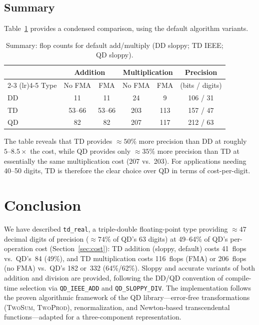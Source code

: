 \documentclass[11pt,a4paper]{article}
\begin{document}
\subsection{Summary}

Table~\ref{tab:summary-flops} provides a condensed comparison,
using the default algorithm variants.

\begin{table}[h]
\centering
\caption{Summary: flop counts for default add/multiply
  (DD sloppy; TD IEEE; QD sloppy).}
\label{tab:summary-flops}
\begin{tabular}{lccccc}
\toprule
      & \multicolumn{2}{c}{Addition}
      & \multicolumn{2}{c}{Multiplication}
      & Precision \\
\cmidrule(lr){2-3} \cmidrule(lr){4-5}
Type & No FMA & FMA & No FMA & FMA & (bits / digits) \\
\midrule
DD &  11 &  11 &  24 &   9 & 106 / 31 \\
TD &  53--66 &  53--66 & 203 & 113 & 157 / 47 \\
QD &  82 &  82 & 207 & 117 & 212 / 63 \\
\bottomrule
\end{tabular}
\end{table}

The table reveals that TD provides $\approx 50\%$ more precision
than DD at roughly $5\text{--}8.5\times$ the cost, while QD provides
only $\approx 35\%$ more precision than TD at essentially the same
multiplication cost (207 vs.~203).  For applications needing 40--50
digits, TD is therefore the clear choice over QD in terms of
cost-per-digit.


\section{Conclusion}
\label{sec:conclusion}

We have described \texttt{td\_real}, a triple-double floating-point
type providing $\approx 47$ decimal digits of precision ($\approx
74\%$ of QD's 63 digits) at 49--64\% of QD's per-operation cost
(Section~\ref{sec:cost}): TD addition (sloppy, default) costs
41~flops vs.\ QD's~84 (49\%), and TD multiplication costs
116~flops (FMA) or 206~flops (no FMA) vs.\ QD's 182 or~332
(64\%/62\%).  Sloppy and accurate variants of both addition
and division are provided, following the DD/QD convention of
compile-time selection via \texttt{QD\_IEEE\_ADD} and
\texttt{QD\_SLOPPY\_DIV}.
The implementation follows the proven algorithmic framework of the QD
library---error-free transformations (\textsc{TwoSum},
\textsc{TwoProd}), renormalization, and Newton-based transcendental
functions---adapted for a three-component representation.
\end{document}
